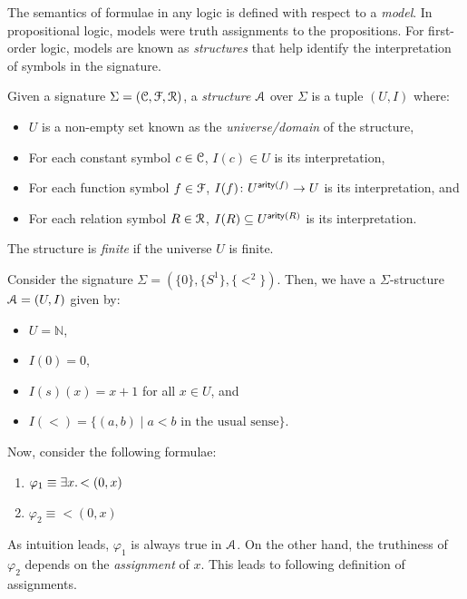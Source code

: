 \documentclass[11pt,usenames, dvipsnames]{article}
\DeclareRobustCommand{\euscr}[1]{%
  \text{\usefont{U}{eus}{m}{n}#1}%
}
\begin{document}
The semantics of formulae in any logic is defined with respect to a \emph{model}. In propositional logic, models were truth assignments to the propositions. For first-order logic, models are known as \emph{structures} that help identify the interpretation of symbols in the signature.

\begin{definition}[Structure]
  Given a signature $\Sigma = (\conn, \func, \reln)$, a \emph{structure} $\euscr{A}$ over $\Sigma$ is a tuple $(U, I)$ where:
  \begin{itemize}
    \item $U$ is a non-empty set known as the \emph{universe/domain} of the structure,
    \item For each constant symbol $c \in \conn$, $I(c) \in U$ is its interpretation,
    \item For each function symbol $f \in \func$, $I(f) \colon U^{\mathsf{arity}(f)} \rightarrow U$ is its interpretation, and
    \item For each relation symbol $R \in \reln$, $I(R) \subseteq U^{\mathsf{arity}(R)}$ is its interpretation.
  \end{itemize}

  The structure is \emph{finite} if the universe $U$ is finite.
\end{definition}

\begin{example}
  Consider the signature $\Sigma = (\{0\}, \{S^1\}, \{<^2\})$. Then, we have a $\Sigma$-structure $\euscr{A} = (U, I)$ given by:
  \begin{itemize}
    \item $U = \mathbb{N}$,
    \item $I(0) = 0$,
    \item $I(s)(x) = x + 1$ for all $x \in U$, and
    \item $I(<) = \{(a, b) \mid a < b \text{ in the usual sense}\}$.
  \end{itemize}

  Now, consider the following formulae:
  \begin{enumerate}
    \item $\varphi_1 \equiv \exists x \ldotp <(0, x)$
    \item $\varphi_2 \equiv <(0, x)$
  \end{enumerate}

  As intuition leads, $\varphi_1$ is always true in $\euscr{A}$. On the other hand, the truthiness of $\varphi_2$ depends on the \emph{assignment} of $x$. This leads to following definition of assignments.
\end{example}
\end{document}
